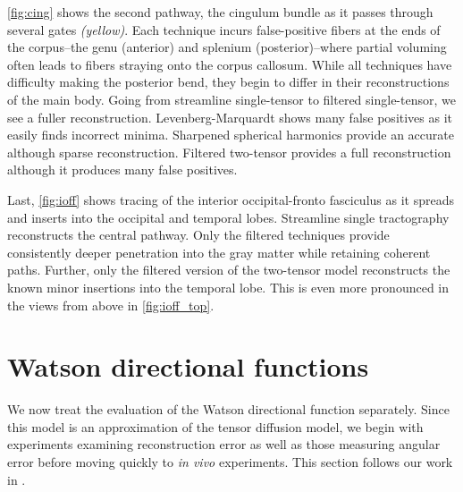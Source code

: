 \documentclass[final,hyperref]{gatech-thesis}
\newcommand{\citet}[1]{\cite{#1}} %
\newcommand{\invivo}{\textit{in vivo}\xspace}
\begin{document}
\autoref{fig:cing} shows the second pathway, the cingulum bundle as it passes
through several gates \textit{(yellow)}.  Each technique incurs false-positive
fibers at the ends of the corpus--the genu (anterior) and splenium
(posterior)--where partial voluming often leads to fibers straying onto the
corpus callosum.  While all techniques have difficulty making the posterior
bend, they begin to differ in their reconstructions of the main body.  Going
from streamline single-tensor to filtered single-tensor, we see a fuller
reconstruction.  Levenberg-Marquardt shows many false positives as it easily
finds incorrect minima.  Sharpened spherical harmonics provide an accurate
although sparse reconstruction.  Filtered two-tensor provides a full
reconstruction although it produces many false positives.

Last, \autoref{fig:ioff} shows tracing of the interior occipital-fronto
fasciculus as it spreads and inserts into the occipital and temporal lobes.
Streamline single tractography reconstructs the central pathway.  Only the
filtered techniques provide consistently deeper penetration into the gray
matter while retaining coherent paths.  Further, only the filtered version of
the two-tensor model reconstructs the known minor insertions into the temporal
lobe.  This is even more pronounced in the views from above in
\autoref{fig:ioff_top}.






\section{Watson directional functions}

We now treat the evaluation of the Watson directional function separately.
%
Since this model is an approximation of the tensor diffusion model, we begin
with experiments examining reconstruction error as well as those measuring
angular error before moving quickly to \invivo experiments.
%
This section follows our work in \citet{malcolm2010mia}.
\end{document}

